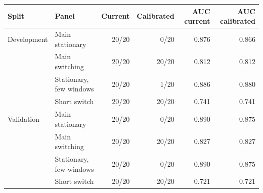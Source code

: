 \begin{tabular}{llrrrr}
\toprule
Split & Panel & Current & Calibrated & AUC current & AUC calibrated \\
\midrule
Development & Main stationary & 20/20 & 0/20 & 0.876 & 0.866 \\
 & Main switching & 20/20 & 20/20 & 0.812 & 0.812 \\
 & Stationary, few windows & 20/20 & 1/20 & 0.886 & 0.880 \\
 & Short switch & 20/20 & 20/20 & 0.741 & 0.741 \\
\midrule
Validation & Main stationary & 20/20 & 0/20 & 0.890 & 0.875 \\
 & Main switching & 20/20 & 20/20 & 0.827 & 0.827 \\
 & Stationary, few windows & 20/20 & 0/20 & 0.890 & 0.875 \\
 & Short switch & 20/20 & 20/20 & 0.721 & 0.721 \\
\bottomrule
\end{tabular}
